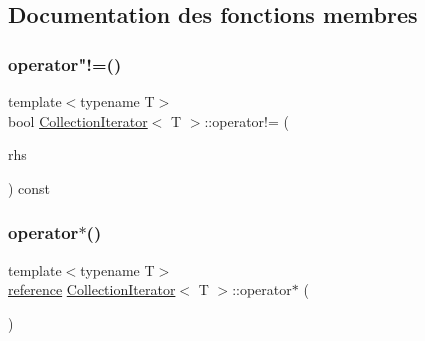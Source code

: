 \subsection{Documentation des fonctions membres}
\mbox{\label{class_collection_iterator_a97f25f4b7c4f5ad3364c79224d31c666}} 
\subsubsection{\texorpdfstring{operator"!=()}{operator!=()}}
{\footnotesize\ttfamily template$<$typename T$>$ \\
bool \hyperlink{class_collection_iterator}{Collection\+Iterator}$<$ T $>$\+::operator!= (\begin{DoxyParamCaption}\item[{const \hyperlink{class_collection_iterator}{Collection\+Iterator}$<$ T $>$ \&}]{rhs }\end{DoxyParamCaption}) const\hspace{0.3cm}{\ttfamily [inline]}}

\mbox{\label{class_collection_iterator_a33e98fda7a97c6105562074ca52d9a36}} 
\subsubsection{\texorpdfstring{operator$\ast$()}{operator*()}\hspace{0.1cm}{\footnotesize\ttfamily [1/2]}}
{\footnotesize\ttfamily template$<$typename T$>$ \\
\hyperlink{class_collection_iterator_aac15417aa7a67fdfb86b8bad1b4d5ddf}{reference} \hyperlink{class_collection_iterator}{Collection\+Iterator}$<$ T $>$\+::operator$\ast$ (\begin{DoxyParamCaption}{ }\end{DoxyParamCaption})\hspace{0.3cm}{\ttfamily [inline]}}

\mbox{\label{class_collection_iterator_ad8f71e444278158b6f290d723a3639ac}} 
